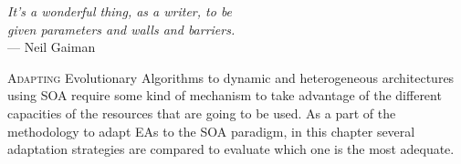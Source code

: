 \label{chap:adaptive}



\begin{flushright}{\slshape
    It's a wonderful thing, as a writer, to be 
    \\given parameters and walls and barriers.} \\ \medskip
    --- {Neil Gaiman}
\end{flushright}

\minitoc\mtcskip
\vfill


\lettrine{A}{dapting} Evolutionary Algorithms to dynamic and heterogeneous architectures using SOA require some kind of mechanism to take advantage of the different capacities of the resources that are going to be used. As a part of the methodology to adapt EAs to the SOA paradigm, in this chapter several adaptation strategies are compared to evaluate which one is the most adequate. 

